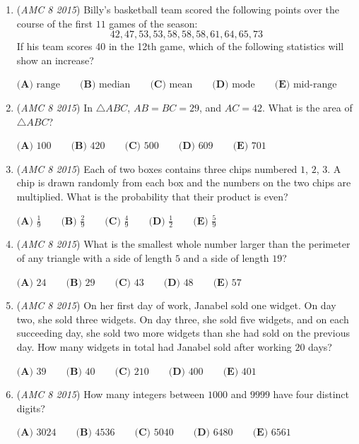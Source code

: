 \begin{enumerate}
	\item (\textit{AMC 8 2015}) Billy's basketball team scored the following points over the course of the first $11$ games of the season: 
 \[42, 47, 53, 53, 58, 58, 58, 61, 64, 65, 73\] If his team scores 40 in the 12th game, which of the following statistics will show an increase?


 $\textbf{(A) } \text{range} \qquad \textbf{(B) } \text{median} \qquad \textbf{(C) } \text{mean} \qquad \textbf{(D) } \text{mode} \qquad \textbf{(E) } \text{mid-range}$


	\item (\textit{AMC 8 2015}) In $\triangle ABC$, $AB=BC=29$, and $AC=42$. What is the area of $\triangle ABC$?


 $\textbf{(A) }100\qquad\textbf{(B) }420\qquad\textbf{(C) }500\qquad\textbf{(D) }609\qquad \textbf{(E) }701$


	\item (\textit{AMC 8 2015}) Each of two boxes contains three chips numbered $1$, $2$, $3$. A chip is drawn randomly from each box and the numbers on the two chips are multiplied. What is the probability that their product is even?


 $\textbf{(A) }\frac{1}{9}\qquad\textbf{(B) }\frac{2}{9}\qquad\textbf{(C) }\frac{4}{9}\qquad\textbf{(D) }\frac{1}{2}\qquad \textbf{(E) }\frac{5}{9}$


	\item (\textit{AMC 8 2015}) What is the smallest whole number larger than the perimeter of any triangle with a side of length $5$ and a side of length $19$?


 $\textbf{(A) }24\qquad\textbf{(B) }29\qquad\textbf{(C) }43\qquad\textbf{(D) }48\qquad \textbf{(E) }57$


	\item (\textit{AMC 8 2015}) On her first day of work, Janabel sold one widget. On day two, she sold three widgets. On day three, she sold five widgets, and on each succeeding day, she sold two more widgets than she had sold on the previous day. How many widgets in total had Janabel sold after working $20$ days?


 $\textbf{(A) }39\qquad\textbf{(B) }40\qquad\textbf{(C) }210\qquad\textbf{(D) }400\qquad \textbf{(E) }401$


	\item (\textit{AMC 8 2015}) How many integers between $1000$ and $9999$ have four distinct digits?


 $\textbf{(A) }3024\qquad\textbf{(B) }4536\qquad\textbf{(C) }5040\qquad\textbf{(D) }6480\qquad \textbf{(E) }6561$



\end{enumerate}
